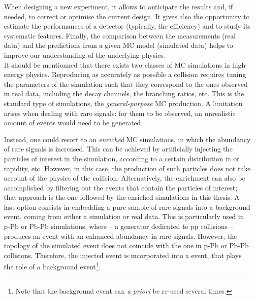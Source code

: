 When designing a new experiment, it allows to anticipate the results and, if needed, to correct or optimise the current design. It gives also the opportunity to estimate the performances of a detector (typically, the efficiency) and to study its systematic features. Finally, the comparison between the measurements (real data) and the predictions from a given MC model (simulated data) helps to improve our understanding of the underlying physics.\\

It should be mentionned that there exists two classes of MC simulations in high-energy physics. Reproducing as accurately as possible a collision requires tuning the parameters of the simulation such that they correspond to the ones observed in real data, including the decay channels, the branching ratios, etc. This is the standard type of simulations, the \textit{general-purpose} MC production. A limitation arises when dealing with rare signals: for them to be observed, an unrealistic amount of events would need to be generated. 

Instead, one could resort to an \textit{enriched} MC simulations, in which the abundancy of rare signals is increased. This can be achieved by artificially injecting the particles of interest in the simulation, according to a certain distribution in \pT or rapidity, etc. However, in this case, the production of such particles does not take account of the physics of the collision. Alternatively, the enrichment can also be accomplished by filtering out the events that contain the particles of interest; that approach is the one followed by the enriched simulations in this thesis. A last option consists in embedding a pure sample of rare signals into a background event, coming from either a simulation or real data. This is particularly used in p-Pb or Pb-Pb simulations, where \Pythia -- a generator dedicated to pp collisions -- produces an event with an enhanced abundancy in rare signals. However, the topology of the simulated event does not coincide with the one in p-Pb or Pb-Pb collisions. Therefore, the injected event is incorporated into a \Hijing event, that plays the role of a background event\footnote{Note that the background event can \textit{a priori} be re-used several times.}.
